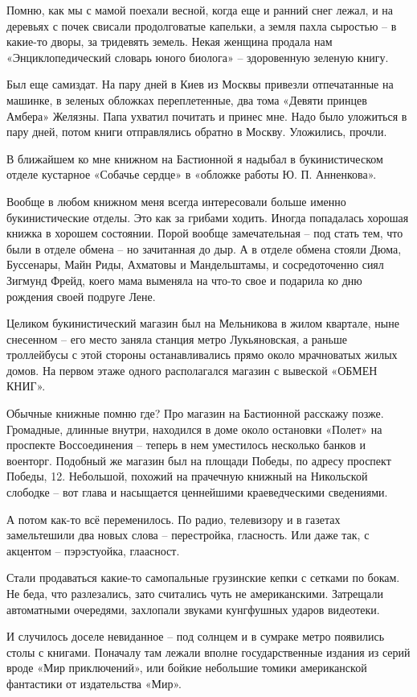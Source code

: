 Помню, как мы с мамой поехали весной, когда еще и ранний снег лежал, и на деревьях с почек свисали продолговатые капельки, а земля пахла сыростью – в какие-то дворы, за тридевять земель. Некая женщина продала нам «Энциклопедический словарь юного биолога» – здоровенную зеленую книгу.

Был еще самиздат. На пару дней в Киев из Москвы привезли отпечатанные на машинке, в зеленых обложках переплетенные, два тома «Девяти принцев Амбера» Желязны. Папа ухватил почитать и принес мне. Надо было уложиться в пару дней, потом книги отправлялись обратно в Москву. Уложились, прочли.

В ближайшем ко мне книжном на Бастионной я надыбал в букинистическом отделе кустарное «Собачье сердце» в «обложке работы Ю. П. Анненкова».

Вообще в любом книжном меня всегда интересовали больше именно букинистические отделы. Это как за грибами ходить. Иногда попадалась хорошая книжка в хорошем состоянии. Порой вообще замечательная – под стать тем, что были в отделе обмена – но зачитанная до дыр. А в отделе обмена стояли Дюма, Буссенары, Майн Риды, Ахматовы и Мандельштамы, и сосредоточенно сиял Зигмунд Фрейд, коего мама выменяла на что-то свое и подарила ко дню рождения своей подруге Лене.

Целиком букинистический магазин был на Мельникова в жилом квартале, ныне снесенном – его место заняла станция метро Лукьяновская, а раньше троллейбусы с этой стороны останавливались прямо около мрачноватых жилых домов. На первом этаже одного располагался магазин с вывеской «ОБМЕН КНИГ».

Обычные книжные помню где? Про магазин на Бастионной расскажу позже. Громадные, длинные внутри, находился в доме около остановки «Полет» на проспекте Воссоединения – теперь в нем уместилось несколько банков и военторг. Подобный же магазин был на площади Победы, по адресу проспект Победы, 12. Небольшой, похожий на прачечную книжный на Никольской слободке – вот глава и насыщается ценнейшими краеведческими сведениями.

А потом как-то всё переменилось. По радио, телевизору и в газетах замельтешили два новых слова – перестройка, гласность. Или даже так, с акцентом – пэрэстуойка, глаасност. 

Стали продаваться какие-то самопальные грузинские кепки с сетками по бокам. Не беда, что разлезались, зато считались чуть не американскими. Затрещали автоматными очередями, захлопали звуками кунгфушных ударов видеотеки. 

И случилось доселе невиданное – под солнцем и в сумраке метро появились столы с книгами. Поначалу там лежали вполне государственные издания из серий вроде «Мир приключений», или бойкие небольшие томики американской фантастики от издательства «Мир».

